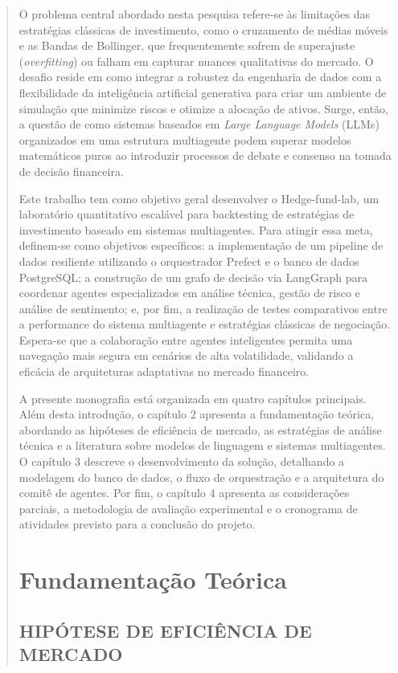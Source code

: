 \documentclass{eic-bcc-tcc}
\begin{document}
\begin{abstract}
O problema central abordado nesta pesquisa refere-se às limitações das estratégias clássicas de investimento, como o cruzamento de médias móveis e as Bandas de Bollinger, que frequentemente sofrem de superajuste (\textit{overfitting}) ou falham em capturar nuances qualitativas do mercado. O desafio reside em como integrar a robustez da engenharia de dados com a flexibilidade da inteligência artificial generativa para criar um ambiente de simulação que minimize riscos e otimize a alocação de ativos. Surge, então, a questão de como sistemas baseados em \textit{Large Language Models} (LLMs) organizados em uma estrutura multiagente podem superar modelos matemáticos puros ao introduzir processos de debate e consenso na tomada de decisão financeira.

Este trabalho tem como objetivo geral desenvolver o Hedge-fund-lab, um laboratório quantitativo escalável para backtesting de estratégias de investimento baseado em sistemas multiagentes. Para atingir essa meta, definem-se como objetivos específicos: a implementação de um pipeline de dados resiliente utilizando o orquestrador Prefect e o banco de dados PostgreSQL; a construção de um grafo de decisão via LangGraph para coordenar agentes especializados em análise técnica, gestão de risco e análise de sentimento; e, por fim, a realização de testes comparativos entre a performance do sistema multiagente e estratégias clássicas de negociação. Espera-se que a colaboração entre agentes inteligentes permita uma navegação mais segura em cenários de alta volatilidade, validando a eficácia de arquiteturas adaptativas no mercado financeiro.

A presente monografia está organizada em quatro capítulos principais. Além desta introdução, o capítulo 2 apresenta a fundamentação teórica, abordando as hipóteses de eficiência de mercado, as estratégias de análise técnica e a literatura sobre modelos de linguagem e sistemas multiagentes. O capítulo 3 descreve o desenvolvimento da solução, detalhando a modelagem do banco de dados, o fluxo de orquestração e a arquitetura do comitê de agentes. Por fim, o capítulo 4 apresenta as considerações parciais, a metodologia de avaliação experimental e o cronograma de atividades previsto para a conclusão do projeto.


\chapter{Fundamentação Teórica}
\label{cha:fundamentacao}

\section{HIPÓTESE DE EFICIÊNCIA DE MERCADO}


\end{abstract}
\end{document}
